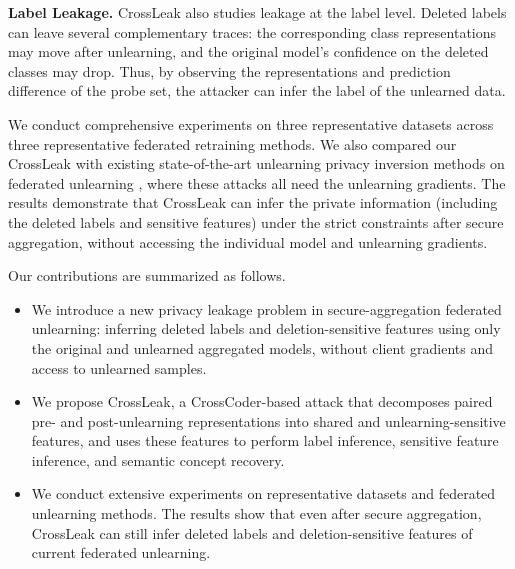 \noindent
\textbf{Label Leakage.}
CrossLeak also studies leakage at the label level. Deleted labels can leave several complementary traces: the corresponding class representations may move after unlearning, and the original model's confidence on the deleted classes may drop. Thus, by observing the representations and prediction difference of the probe set, the attacker can infer the label of the unlearned data.


We conduct comprehensive experiments on three representative datasets across three representative federated retraining methods. We also compared our CrossLeak with existing state-of-the-art unlearning privacy inversion methods on federated unlearning \citep{hu2024learn,wang2025label}, where these attacks all need the unlearning gradients. The results demonstrate that CrossLeak can infer the private information (including the deleted labels and sensitive features) under the strict constraints after secure aggregation, without accessing the individual model and unlearning gradients.
 


Our contributions are summarized as follows.
\begin{itemize}[itemsep=0pt, parsep=0pt, leftmargin=*]
	\item We introduce a new privacy leakage problem in secure-aggregation federated unlearning: inferring deleted labels and deletion-sensitive features using only the original and unlearned aggregated models, without client gradients and access to unlearned samples.
	\item We propose CrossLeak, a CrossCoder-based attack that decomposes paired pre- and post-unlearning representations into shared and unlearning-sensitive features, and uses these features to perform label inference, sensitive feature inference, and semantic concept recovery.
	\item We conduct extensive experiments on representative datasets and federated unlearning methods. The results show that even after secure aggregation, CrossLeak can still  infer deleted labels and deletion-sensitive features of current federated unlearning.
\end{itemize}


 
